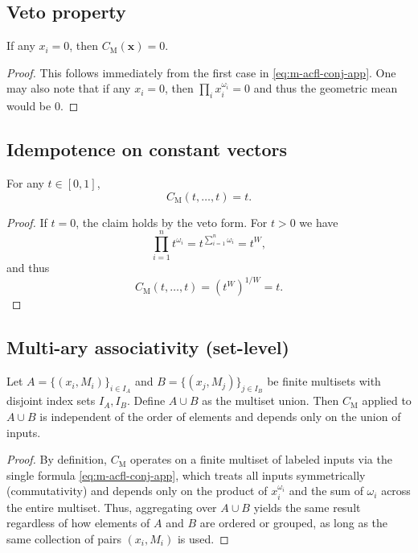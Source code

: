\documentclass[11pt]{article}
\begin{document}
\subsection{Veto property}

\begin{proposition}[Veto]
If any $x_i = 0$, then $C_{\mathrm{M}}(\mathbf{x}) = 0$.
\end{proposition}

\begin{proof}
This follows immediately from the first case in \eqref{eq:m-acfl-conj-app}. 
One may also note that if any $x_i=0$, then $\prod_i x_i^{\omega_i} = 0$ and thus the geometric mean would be $0$.
\end{proof}

\subsection{Idempotence on constant vectors}

\begin{proposition}[Idempotence]
For any $t \in [0,1]$,
\[
C_{\mathrm{M}}(t,\dots,t) = t.
\]
\end{proposition}

\begin{proof}
If $t=0$, the claim holds by the veto form.
For $t>0$ we have
\[
\prod_{i=1}^n t^{\omega_i} = t^{\sum_{i=1}^n \omega_i} = t^{W},
\]
and thus
\[
C_{\mathrm{M}}(t,\dots,t)
= \left(t^{W}\right)^{1/W} = t.
\]
\end{proof}

\subsection{Multi-ary associativity (set-level)}

\begin{proposition}
Let $A=\{(x_i,M_i)\}_{i\in I_A}$ and $B=\{(x_j,M_j)\}_{j\in I_B}$ be finite multisets with disjoint index sets $I_A, I_B$. 
Define $A \cup B$ as the multiset union. 
Then $C_{\mathrm{M}}$ applied to $A \cup B$ is independent of the order of elements and depends only on the union of inputs.
\end{proposition}

\begin{proof}
By definition, $C_{\mathrm{M}}$ operates on a finite multiset of labeled inputs via the single formula \eqref{eq:m-acfl-conj-app}, which treats all inputs symmetrically (commutativity) and depends only on the product of $x_i^{\omega_i}$ and the sum of $\omega_i$ across the entire multiset. 
Thus, aggregating over $A\cup B$ yields the same result regardless of how elements of $A$ and $B$ are ordered or grouped, as long as the same collection of pairs $(x_i,M_i)$ is used.
\end{proof}
\end{document}
